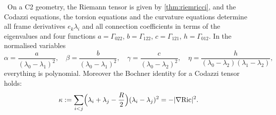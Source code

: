 \begin{theorem}\label{thm:c2first}\ver\
On a C2 geometry, the Riemann tensor is given by \cref{thm:riemricci}, and the Codazzi equations, the torsion equations and the curvature equations determine all frame derivatives $e_k\lambda_i$ and all connection coefficients in terms of the eigenvalues and four functions $a=\Gamma_{022}$, $b=\Gamma_{122}$, $c=\Gamma_{121}$, $h=\Gamma_{012}$. In the normalised variables
\[
\alpha=\frac{a}{(\lambda_0-\lambda_1)^2},\quad \beta=\frac{b}{(\lambda_0-\lambda_1)^2},\quad \gamma=\frac{c}{(\lambda_0-\lambda_2)^2},\quad \eta=\frac{h}{(\lambda_0-\lambda_2)(\lambda_1-\lambda_2)},
\]
everything is polynomial. Moreover the Bochner identity for a Codazzi tensor holds:
\[
\kappa:=\sum_{i<j}\Bigl(\lambda_i+\lambda_j-\frac R2\Bigr)(\lambda_i-\lambda_j)^2=-|\nabla\mathrm{Ric}|^2 .
\]
\end{theorem}
